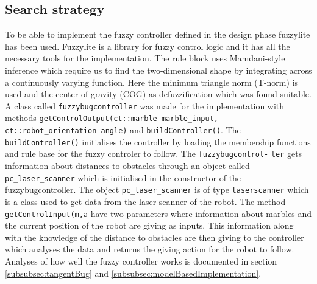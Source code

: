 \documentclass[../Head/Main.tex]{subfiles}
\begin{document}
\subsection{Search strategy}
\label{subsec:searhStrategyImplementation}

To be able to implement the fuzzy controller defined in the design phase fuzzylite has been used. Fuzzylite is a library for fuzzy control logic and it has all the necessary tools for the implementation. The rule block uses Mamdani-style inference which require us to find the two-dimensional shape by integrating across a continuously varying function. Here the minimum triangle norm (T-norm) is used and the center of gravity (COG) as defuzzification which was found suitable. A class called \texttt{fuzzybugcontroller} was made for the implementation with methods \texttt{getControlOutput(ct::marble marble\_input, ct::robot\_orientation angle)} and \texttt{buildController()}. The \texttt{buildController()} initialises the controller by loading the membership functions and rule base for the fuzzy controler to follow. The \texttt{fuzzybugcontrol-} \texttt{ler} gets information about distances to obstacles through an object called \texttt{pc\_laser\_scanner} which is initialised in the constructor of the fuzzybugcontroller. The object \texttt{pc\_laser\_scanner} is of type \texttt{laserscanner} which is a class used to get data from the laser scanner of the robot. The method \texttt{getControlInput(m,a} have two parameters where information about marbles and the current position of the robot are giving as inputs. This information along with the knowledge of the distance to obstacles are then giving to the controller which analyses the data and returns the giving action for the robot to follow. Analyses of how well the fuzzy controller works is documented in section \ref{subsubsec:tangentBug} and \ref{subsubsec:modelBasedImplementation}.        	
\end{document}
